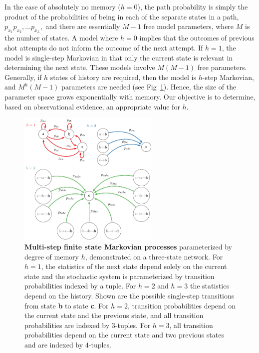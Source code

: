 \documentclass{IOS-Book-Article}
\renewcommand{\bf}[1]{\textbf{#1}}
\begin{document}
In the case of absolutely no memory ($h=0$), the path probability is simply the product of the probabilities of being in each of the separate states in a path, $p_{x_1}p_{x_2},\ldots p_{x_L},$ and there are essentially $M-1$ free model parameters, where $M$ is the number of states. A model where $h=0$ implies that the outcomes of previous shot attempts do not inform the outcome of the next attempt.
If $h=1$, the model is single-step Markovian in that only the current state is relevant in determining the next state. These models involve $M(M-1)$ free parameters. Generally, if $h$ states of history are required, then the model is $h$-step Markovian, and $M^h(M-1)$ parameters are needed (see Fig~\ref{fig:fig1}). Hence, the size of the parameter space grows exponentially with memory. Our objective is to determine, based on observational evidence, an appropriate value for $h$. 

 
 \begin{figure}
 \includegraphics[width=0.6\textwidth]{fig1a}
 \caption{\bf{Multi-step finite state Markovian processes}  parameterized by degree of memory $h$, demonstrated on a three-state network. For $h=1$, the statistics of the next state depend solely on the current state and the stochastic system is parameterized by transition probabilities indexed by a tuple. For $h=2$ and $h=3$ the statistics depend on the history.  Shown are the possible single-step transitions from state \bf{b} to state \bf{c}. For $h=2$, transition probabilities depend on the
 current state and the previous state, and all transition probabilities are indexed by $3$-tuples. For $h=3$, all transition probabilities depend on the current state and two previous states and are indexed by $4$-tuples. } \label{fig:fig1}
 \end{figure}
 
\end{document}
